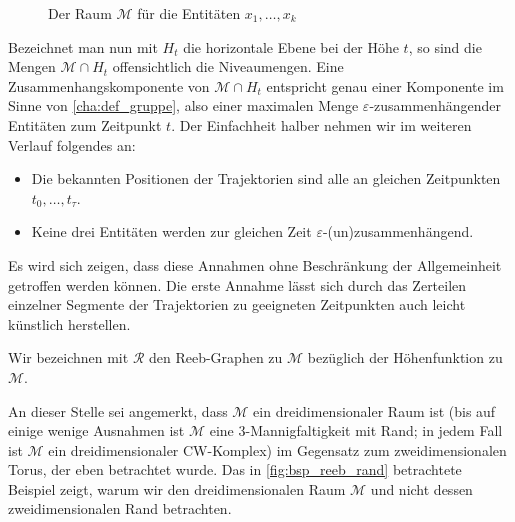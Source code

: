 \begin{figure}[htbp]
	\Centering
	
	\hspace{1em}
	\label{fig:reeb_graph}
	\caption{Der Raum $\mathcal{M}$ für die Entitäten $x_1, \ldots ,x_k$}
\end{figure}

Bezeichnet man nun mit $H_t$ die horizontale Ebene bei der Höhe $t$, so sind die Mengen $\mathcal{M} \cap H_t$ offensichtlich die Niveaumengen.
Eine Zusammenhangskomponente von $\mathcal{M} \cap H_t$ entspricht genau einer Komponente im Sinne von \cref{cha:def_gruppe}, also einer maximalen Menge $\varepsilon$-zusammenhängender Entitäten zum Zeitpunkt $t$.
Der Einfachheit halber nehmen wir im weiteren Verlauf folgendes an:
\begin{itemize}
	\item Die bekannten Positionen der Trajektorien sind alle an gleichen Zeitpunkten $t_0, \ldots ,t_\tau$.
	\item Keine drei Entitäten werden zur gleichen Zeit $\varepsilon$-(un)zusammenhängend.
\end{itemize}
Es wird sich zeigen, dass diese Annahmen ohne Beschränkung der Allgemeinheit getroffen werden können.
Die erste Annahme lässt sich durch das Zerteilen einzelner Segmente der Trajektorien zu geeigneten Zeitpunkten auch leicht künstlich herstellen.

\begin{definition}[{name=[Reeb-Graph der \GrpStruktur]}]
	Wir bezeichnen mit $\mathcal{R}$ den Reeb-Graphen zu $\mathcal{M}$ bezüglich der Höhenfunktion zu $\mathcal{M}$.
\end{definition}

An dieser Stelle sei angemerkt, dass $\mathcal{M}$ ein dreidimensionaler Raum ist (bis auf einige wenige Ausnahmen ist $\mathcal{M}$ eine 3-Mannigfaltigkeit mit Rand; in jedem Fall ist $\mathcal{M}$ ein dreidimensionaler CW-Komplex) im Gegensatz zum zweidimensionalen Torus, der eben betrachtet wurde.
Das in \cref{fig:bsp_reeb_rand} betrachtete Beispiel zeigt, warum wir den dreidimensionalen Raum $\mathcal{M}$ und nicht dessen zweidimensionalen Rand betrachten.


